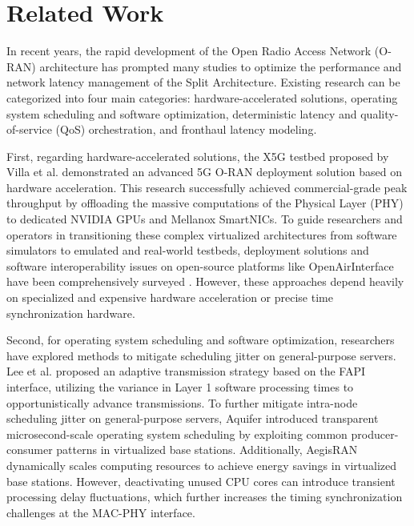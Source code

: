 \documentclass[../my_ntust_thesis.tex]{subfiles}
\begin{document}
\section{Related Work}
\label{sec:related_works}

In recent years, the rapid development of the Open Radio Access Network (O-RAN) architecture has prompted many studies to optimize the performance and network latency management of the Split Architecture. Existing research can be categorized into four main categories: hardware-accelerated solutions, operating system scheduling and software optimization, deterministic latency and quality-of-service (QoS) orchestration, and fronthaul latency modeling.

First, regarding hardware-accelerated solutions, the X5G testbed proposed by Villa et al. \cite{11039666} demonstrated an advanced 5G O-RAN deployment solution based on hardware acceleration. This research successfully achieved commercial-grade peak throughput by offloading the massive computations of the Physical Layer (PHY) to dedicated NVIDIA GPUs and Mellanox SmartNICs. To guide researchers and operators in transitioning these complex virtualized architectures from software simulators to emulated and real-world testbeds, deployment solutions and software interoperability issues on open-source platforms like OpenAirInterface have been comprehensively surveyed \cite{herrera2026tutorial}. However, these approaches depend heavily on specialized and expensive hardware acceleration or precise time synchronization hardware.

Second, for operating system scheduling and software optimization, researchers have explored methods to mitigate scheduling jitter on general-purpose servers. Lee et al. \cite{Lee2022} proposed an adaptive transmission strategy based on the FAPI interface, utilizing the variance in Layer 1 software processing times to opportunistically advance transmissions. To further mitigate intra-node scheduling jitter on general-purpose servers, Aquifer \cite{jia2024aquifer} introduced transparent microsecond-scale operating system scheduling by exploiting common producer-consumer patterns in virtualized base stations. Additionally, AegisRAN \cite{hidalgo2025aegisran} dynamically scales computing resources to achieve energy savings in virtualized base stations. However, deactivating unused CPU cores can introduce transient processing delay fluctuations, which further increases the timing synchronization challenges at the MAC-PHY interface.
\end{document}
